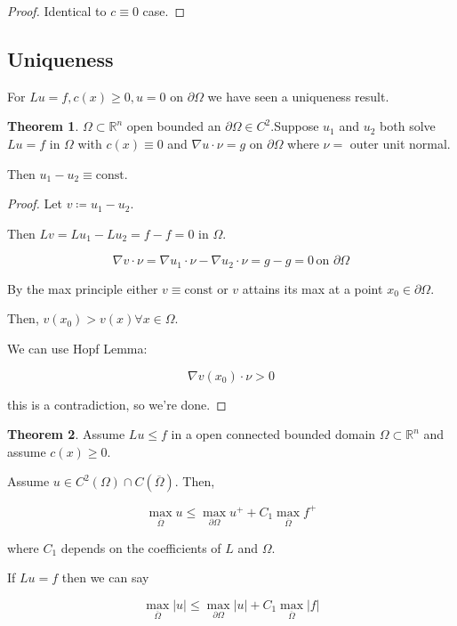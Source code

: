 \documentclass{article}
\theoremstyle{definition}
\newtheorem{theorem}{Theorem}
\begin{document}
\begin{proof}
    Identical to \(c\equiv 0\) case.
\end{proof}

\subsection*{Uniqueness}

For \(Lu = f, c(x) \geq 0, u=0\) on \(\partial \Omega\) we have seen a uniqueness result.

\begin{theorem}
    \(\Omega \subset \mathbb{R}^n\) open bounded an \(\partial \Omega \in C^2\).Suppose \(u_1\) and \(u_2\) both solve \(Lu = f\) in \(\Omega\) with \(c(x)\equiv 0\) and \(\nabla u \cdot \nu = g\) on \(\partial \Omega\) where \(\nu =\) outer unit normal.

    Then \(u_1 - u_2 \equiv \text{const}\).
\end{theorem}

\begin{proof}
    Let \(v \coloneqq u_1 - u_2\).

    Then \(Lv = Lu_1 - Lu_2 = f-f = 0\) in \(\Omega\).

    \[
        \nabla v \cdot \nu = \nabla u_1\cdot \nu - \nabla u_2\cdot \nu = g-g = 0 \, \text{on } \partial \Omega
    \]

    By the max principle either \(v\equiv \text{const}\) or \(v\) attains its max at a point \(x_0 \in \partial \Omega\).

    Then, \(v(x_0) > v(x) \forall x\in \Omega\).

    We can use Hopf Lemma:

    \[
        \nabla v(x_0) \cdot \nu > 0
    \]

    this is a contradiction, so we're done.
\end{proof}

\begin{theorem}
    Assume \(Lu \leq f\) in a open connected bounded domain \(\Omega \subset \mathbb{R}^n\) and assume \(c(x) \geq 0\).

    Assume \(u\in C^2(\Omega) \cap C(\overline{\Omega})\). Then,

    \[
        \max_{\overline{\Omega}} u \leq \max_{\partial \Omega} u^+ + C_1 \max_{\overline{\Omega}} f^+
    \]

    where \(C_1\) depends on the coefficients of \(L\) and \(\Omega\).

    If \(Lu = f\) then we can say

    \[
        \max_{\overline{\Omega}} \vert u \vert \leq \max_{\partial \Omega} \vert u \vert + C_1 \max_{\overline{\Omega}} \vert f \vert
    \]
\end{theorem}
\end{document}
